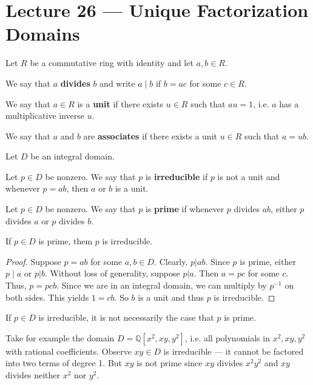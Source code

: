 \section{Lecture 26 — Unique Factorization Domains}

Let $R$ be a commutative ring with identity and let $a,b\in R$.

\begin{definition}
	We say that $a$ \textbf{divides} $b$ and write $a\mid b$ if $b=ac$ for some $c\in R$.
\end{definition}

\begin{definition}[unit]
	We say that $a\in R$ is a \textbf{unit} if there exists $u\in R$ such that $au=1$, i.e. $a$ has a multiplicative inverse $u$.
\end{definition}

\begin{definition}[associates]
	We say that $a$ and $b$ are \textbf{associates} if there exists a unit $u\in R$ such that $a=ub$.
\end{definition}

Let $D$ be an integral domain.

\begin{definition}[irreducible]
	Let $p\in D$ be nonzero. We say that $p$ is \textbf{irreducible} if $p$ is not a unit and whenever $p=ab$, then $a$ or $b$ is a unit.
\end{definition}

\begin{definition}[prime]
	Let $p\in D$ be nonzero. We say that $p$ is \textbf{prime} if whenever $p$ divides $ab$, either $p$ divides $a$ or $p$ divides $b$.
\end{definition}

\begin{lemma}
	If $p\in D$ is prime, them $p$ is irreducible.
\end{lemma}

\begin{proof}
	Suppose $p=ab$ for some $a,b\in D$. Clearly, $p|ab$. Since $p$ is prime, either $p\mid a$ or $p|b$. Without loss of generality, suppose $p|a$. Then $a=pc$ for some $c$. Thus, $p=pcb$. Since we are in an integral domain, we can multiply by $p^{-1}$ on both sides. This yields $1=cb$. So $b$ is a unit and thus $p$ is irreducible.
\end{proof}

\begin{example}
	If $p\in D$ is irreducible, it is not necessarily the case that $p$ is prime.

	Take for example the domain $D=\mathbb Q[x^2,xy,y^2]$, i.e. all polynomials in $x^2,xy,y^2$ with rational coefficients. Observe $xy\in D$ is irreducible — it cannot be factored into two terms of degree 1. But $xy$ is not prime since $xy$ divides $x^2y^2$ and $xy$ divides neither $x^2$ nor $y^2$.
\end{example}

